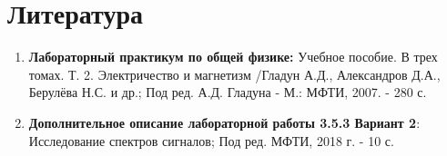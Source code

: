 \documentclass[a4paper, 12pt]{article}%
\begin{document}
\section*{Литература}
\begin{enumerate}
\item \textbf{Лабораторный практикум по общей физике:} Учебное пособие. В трех томах. Т. 2. Электричество и магнетизм /Гладун А.Д., Александров Д.А., Берулёва Н.С. и др.; Под ред. А.Д. Гладуна - М.: МФТИ, 2007. - 280 с.
\item \textbf{Дополнительное описание лабораторной работы 3.5.3 Вариант 2}: Исследование спектров сигналов; Под ред. МФТИ, 2018 г. - 10 с.
\end{enumerate}
\end{document}
